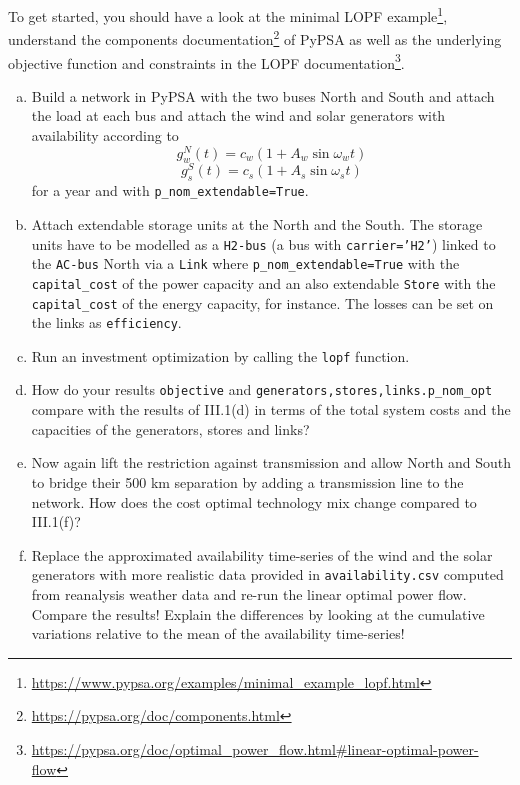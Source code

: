 \documentclass[11pt,a4paper,fleqn]{scrartcl}
\begin{document}
To get started, you should have a look at the minimal LOPF example\footnote{\url{https://www.pypsa.org/examples/minimal_example_lopf.html}}, understand  the components documentation\footnote{\url{https://pypsa.org/doc/components.html}} of PyPSA as well as the underlying objective function and constraints in the LOPF documentation\footnote{\url{https://pypsa.org/doc/optimal_power_flow.html\#linear-optimal-power-flow}}.

\begin{enumerate}[(a)]
 \item Build a network in PyPSA with the two buses North and South and attach the load at each bus and attach the wind and solar generators with availability according to $$g^{N}_{w}(t) = c_w(1+A_w\sin \omega_w t)$$ $$g^{S}_{s}(t) = c_s(1+A_s\sin \omega_s t)$$ for a year and with \texttt{p\_nom\_extendable=True}. 
 \item Attach extendable storage units at the North and the South. The storage units have to be modelled as a \texttt{H2-bus} (a bus with \texttt{carrier='H2'}) linked to the \texttt{AC-bus} North via a \texttt{Link} where \texttt{p\_nom\_extendable=True} with the \texttt{capital\_cost} of the power capacity and an also extendable \texttt{Store} with the \texttt{capital\_cost} of the energy capacity, for instance. The losses can be set on the links as \texttt{efficiency}.
 \item Run an investment optimization by calling the \texttt{lopf} function.
 \item How do your results \texttt{objective} and \texttt{{generators,stores,links}.p\_nom\_opt} compare with the results of III.1(d) in terms of the total system costs and the capacities of the generators, stores and links?
 \item Now again lift the restriction against transmission and allow North and South to bridge their 500 km separation by adding a transmission line to the network. How does the cost optimal technology mix change compared to III.1(f)?
 \item Replace the approximated availability time-series of the wind and the solar generators with more realistic data provided in \texttt{availability.csv} computed from reanalysis weather data and re-run the linear optimal power flow. Compare the results! Explain the differences by looking at the cumulative variations relative to the mean of the availability time-series!
\end{enumerate}
\end{document}
